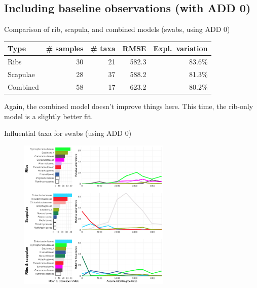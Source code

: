 \documentclass{beamer}
\begin{document}
\subsection{Including baseline observations (with ADD 0)}

\begin{frame}{Comparison of rib, scapula, and combined models (swabs, using ADD 0)}

  \begin{tabular}{lrrrr}
    Type & \# samples & \# taxa & RMSE & Expl.\ variation\\ \hline
    Ribs & 30 & 21 & 582.3 & 83.6\% \\
    Scapulae & 28 & 37 & 588.2 & 81.3\% \\
    Combined & 58 & 17 & 623.2 & 80.2\%
  \end{tabular}

  \vspace{0.2in}

  \footnotesize{
    \noindent Again, the combined model doesn't improve things here.  This time,
    the rib-only model is a slightly better fit.\\
    }
\end{frame}



\begin{frame}{Influential taxa for swabs (using ADD 0)}

  \begin{center}
    \begin{figure}
      \includegraphics[height=2.85in]
        {w_swabs/bacteria/use_families/hl_combined_family_w_baseline_6panels}
    \end{figure}
  \end{center}

\end{frame}
\end{document}
